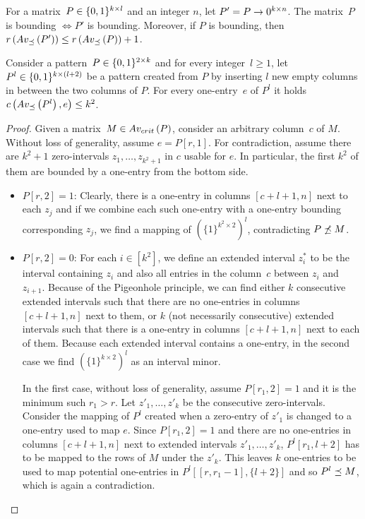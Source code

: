 \begin{obs}
For a matrix~$P\in\{0,1\}^{k\times l}$ and an integer $n$, let $P'=P\rightarrow0^{k\times n}$. The matrix~$P$ is bounding $\Leftrightarrow P'$ is bounding. Moreover, if $P$ is bounding, then $r\left(Av_{\preceq}\left(P'\right)\right)\leq r\left(Av_{\preceq}\left(P\right)\right)+1$.
\end{obs}

\begin{lemma}
\label{lemma:twocols2}
Consider a pattern~$P\in\{0,1\}^{2\times k}$ and for every integer~$l\geq1$, let $P^l\in\{0,1\}^{k\times(l+2)}$ be a pattern created from $P$ by inserting $l$ new empty columns in between the two columns of $P$. For every one-entry~$e$ of $P^l$ it holds $c\left(Av_{\preceq}\left(P^l\right),e\right)\leq k^2$.
\end{lemma}
\begin{proof}
Given a matrix~$M\in Av_{crit}\left(P\right)$, consider an arbitrary column~$c$ of $M$. Without loss of generality, assume $e=P[r,1]$. For contradiction, assume there are $k^2+1$ zero-intervals $z_1,\dots,z_{k^2+1}$ in $c$ usable for $e$. In particular, the first $k^2$ of them are bounded by a one-entry from the bottom side.
\begin{itemize}
	\item $P[r,2]=1$: Clearly, there is a one-entry in columns $[c+l+1,n]$ next to each $z_j$ and if we combine each such one-entry with a one-entry bounding corresponding $z_j$, we find a mapping of $\left(\{1\}^{k^2\times2}\right)^l$, contradicting $P\not\preceq M$.
	\item $P[r,2]=0$: For each $i\in[k^2]$, we define an extended interval $z^*_i$ to be the interval containing $z_i$ and also all entries in the column~$c$ between $z_i$ and $z_{i+1}$. Because of the Pigeonhole principle, we can find either $k$ consecutive extended intervals such that there are no one-entries in columns $[c+l+1,n]$ next to them, or $k$ (not necessarily consecutive) extended intervals such that there is a one-entry in columns $[c+l+1,n]$ next to each of them. Because each extended interval contains a one-entry, in the second case we find $\left(\{1\}^{k\times2}\right)^l$ as an interval minor.
	
	In the first case, without loss of generality, assume $P[r_1,2]=1$ and it is the minimum such $r_1>r$. Let $z'_1,\dots,z'_k$ be the consecutive zero-intervals. Consider the mapping of $P^l$ created when a zero-entry of $z'_1$ is changed to a one-entry used to map $e$. Since $P[r_1,2]=1$ and there are no one-entries in columns $[c+l+1,n]$ next to extended intervals $z'_1,\dots,z'_k$, $P^l[r_1,l+2]$ has to be mapped to the rows of $M$ under the $z'_k$. This leaves $k$ one-entries to be used to map potential one-entries in $P^l[[r,r_1-1],\{l+2\}]$ and so $P^l\preceq M$, which is again a contradiction. \qedhere
\end{itemize}
\end{proof}

